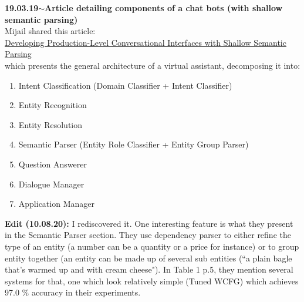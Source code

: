 \documentclass[11pt,a4paper]{article}
\newenvironment{loggentry}[2]%
{\noindent\textbf{#1}\hspace{1cm}$\mathbf{\sim}$\text{ }\textbf{#2}\\}{\vspace{0.5cm}}
\begin{document}
\begin{loggentry}{19.03.19}{Article detailing components of a chat bots (with shallow semantic parsing)}

Mijail shared this article:\\
\href{http://aclweb.org/anthology/D18-2027}{Developing Production-Level Conversational Interfaces with Shallow Semantic Parsing}\\
which presents the general architecture of a virtual assistant, decomposing it into:
\begin{enumerate}
\item Intent Classification (Domain Classifier + Intent Classifier)
\item Entity Recognition
\item Entity Resolution
\item Semantic Parser (Entity Role Classifier + Entity Group Parser)
\item Question Answerer
\item Dialogue Manager
\item Application Manager
\end{enumerate}

\textbf{Edit (10.08.20):} I rediscovered it. One interesting feature is what they present in the Semantic Parser section. They use dependency parser to either refine the type of an entity (a number can be a quantity or a price for instance) or to group entity together (an entity can be made up of several sub entities (``a plain bagle that's warmed up and with cream cheese"). In Table 1 p.5, they mention several systems for that, one which look relatively simple (Tuned WCFG) which achieves 97.0 \% accuracy in their experiments.

\end{loggentry}
\end{document}
